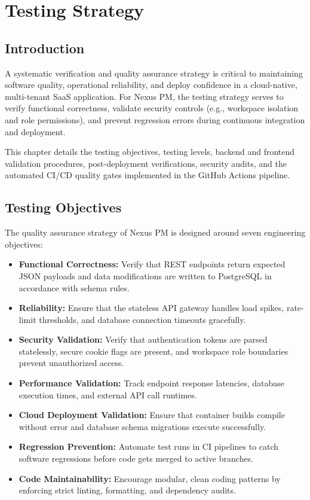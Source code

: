 \chapter{Testing Strategy}
\label{chap:testing-strategy}

\section{Introduction}
A systematic verification and quality assurance strategy is critical to maintaining software quality, operational reliability, and deploy confidence in a cloud-native, multi-tenant SaaS application. For Nexus PM, the testing strategy serves to verify functional correctness, validate security controls (e.g., workspace isolation and role permissions), and prevent regression errors during continuous integration and deployment.

This chapter details the testing objectives, testing levels, backend and frontend validation procedures, post-deployment verifications, security audits, and the automated CI/CD quality gates implemented in the GitHub Actions pipeline.

\section{Testing Objectives}
The quality assurance strategy of Nexus PM is designed around seven engineering objectives:
\begin{itemize}
    \item \textbf{Functional Correctness:} Verify that REST endpoints return expected JSON payloads and data modifications are written to PostgreSQL in accordance with schema rules.
    \item \textbf{Reliability:} Ensure that the stateless API gateway handles load spikes, rate-limit thresholds, and database connection timeouts gracefully.
    \item \textbf{Security Validation:} Verify that authentication tokens are parsed statelessly, secure cookie flags are present, and workspace role boundaries prevent unauthorized access.
    \item \textbf{Performance Validation:} Track endpoint response latencies, database execution times, and external API call runtimes.
    \item \textbf{Cloud Deployment Validation:} Ensure that container builds compile without error and database schema migrations execute successfully.
    \item \textbf{Regression Prevention:} Automate test runs in CI pipelines to catch software regressions before code gets merged to active branches.
    \item \textbf{Code Maintainability:} Encourage modular, clean coding patterns by enforcing strict linting, formatting, and dependency audits.
\end{itemize}

